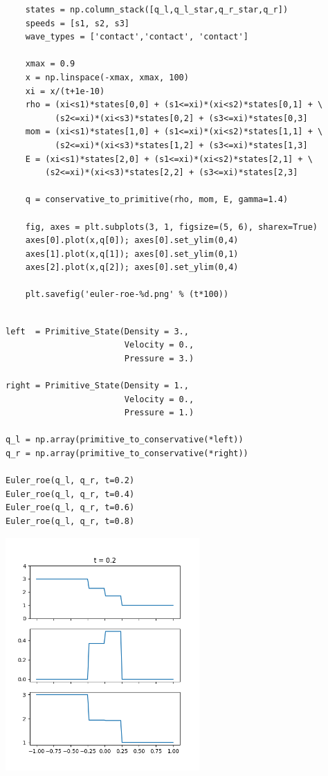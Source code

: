 \documentclass[12pt,fleqn]{article}\usepackage{../../common}
\begin{document}
\begin{verbatim}
    states = np.column_stack([q_l,q_l_star,q_r_star,q_r])
    speeds = [s1, s2, s3]
    wave_types = ['contact','contact', 'contact']
    
    xmax = 0.9
    x = np.linspace(-xmax, xmax, 100)
    xi = x/(t+1e-10)
    rho = (xi<s1)*states[0,0] + (s1<=xi)*(xi<s2)*states[0,1] + \
          (s2<=xi)*(xi<s3)*states[0,2] + (s3<=xi)*states[0,3]
    mom = (xi<s1)*states[1,0] + (s1<=xi)*(xi<s2)*states[1,1] + \
          (s2<=xi)*(xi<s3)*states[1,2] + (s3<=xi)*states[1,3]
    E = (xi<s1)*states[2,0] + (s1<=xi)*(xi<s2)*states[2,1] + \
        (s2<=xi)*(xi<s3)*states[2,2] + (s3<=xi)*states[2,3]
    
    q = conservative_to_primitive(rho, mom, E, gamma=1.4)

    fig, axes = plt.subplots(3, 1, figsize=(5, 6), sharex=True)
    axes[0].plot(x,q[0]); axes[0].set_ylim(0,4)
    axes[1].plot(x,q[1]); axes[0].set_ylim(0,1)
    axes[2].plot(x,q[2]); axes[0].set_ylim(0,4)
    
    plt.savefig('euler-roe-%d.png' % (t*100))    
\end{verbatim}



\begin{verbatim}
    
left  = Primitive_State(Density = 3.,
                        Velocity = 0.,
                        Pressure = 3.)

right = Primitive_State(Density = 1.,
                        Velocity = 0.,
                        Pressure = 1.)

q_l = np.array(primitive_to_conservative(*left))
q_r = np.array(primitive_to_conservative(*right))

Euler_roe(q_l, q_r, t=0.2)
Euler_roe(q_l, q_r, t=0.4)
Euler_roe(q_l, q_r, t=0.6)
Euler_roe(q_l, q_r, t=0.8)
\end{verbatim}


\includegraphics[width=20em]{euler-roe-20.png}
\end{document}
